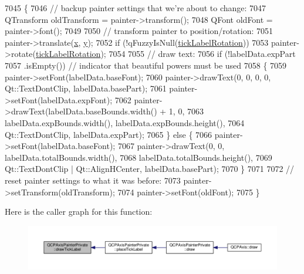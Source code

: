 \begin{DoxyCode}
7045                                           \{
7046   \textcolor{comment}{// backup painter settings that we're about to change:}
7047   QTransform oldTransform = painter->transform();
7048   QFont oldFont = painter->font();
7049 
7050   \textcolor{comment}{// transform painter to position/rotation:}
7051   painter->translate(\hyperlink{_comparision_pictures_2_createtest_image_8m_a9336ebf25087d91c818ee6e9ec29f8c1}{x}, \hyperlink{_comparision_pictures_2_createtest_image_8m_a2fb1c5cf58867b5bbc9a1b145a86f3a0}{y});
7052   \textcolor{keywordflow}{if} (!qFuzzyIsNull(\hyperlink{class_q_c_p_axis_painter_private_ae6ade9232a8e400924009e8edca94bac}{tickLabelRotation}))
7053     painter->rotate(\hyperlink{class_q_c_p_axis_painter_private_ae6ade9232a8e400924009e8edca94bac}{tickLabelRotation});
7054 
7055   \textcolor{comment}{// draw text:}
7056   \textcolor{keywordflow}{if} (!labelData.expPart
7057            .isEmpty()) \textcolor{comment}{// indicator that beautiful powers must be used}
7058   \{
7059     painter->setFont(labelData.baseFont);
7060     painter->drawText(0, 0, 0, 0, Qt::TextDontClip, labelData.basePart);
7061     painter->setFont(labelData.expFont);
7062     painter->drawText(labelData.baseBounds.width() + 1, 0,
7063                       labelData.expBounds.width(), labelData.expBounds.height(),
7064                       Qt::TextDontClip, labelData.expPart);
7065   \} \textcolor{keywordflow}{else} \{
7066     painter->setFont(labelData.baseFont);
7067     painter->drawText(0, 0, labelData.totalBounds.width(),
7068                       labelData.totalBounds.height(),
7069                       Qt::TextDontClip | Qt::AlignHCenter, labelData.basePart);
7070   \}
7071 
7072   \textcolor{comment}{// reset painter settings to what it was before:}
7073   painter->setTransform(oldTransform);
7074   painter->setFont(oldFont);
7075 \}
\end{DoxyCode}


Here is the caller graph for this function\+:\nopagebreak
\begin{figure}[H]
\begin{center}
\leavevmode
\includegraphics[width=350pt]{class_q_c_p_axis_painter_private_ad8f2f12cd35b8189e8bf96679e873933_icgraph}
\end{center}
\end{figure}


